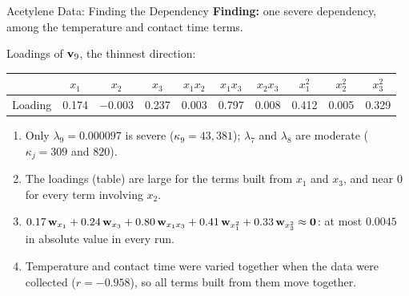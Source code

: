 \begin{frame}{Acetylene Data: Finding the Dependency}
    \small
    \textbf{Finding:} one severe dependency, among the temperature and contact time terms.
    \begin{center}
        \footnotesize
        Loadings of $\mathbf{v}_9$, the thinnest direction:\\[0.2em]
        \begin{tabular}{lccccccccc}
            \toprule
            & $x_1$ & $x_2$ & $x_3$ & $x_1x_2$ & $x_1x_3$ & $x_2x_3$ & $x_1^2$ & $x_2^2$ & $x_3^2$ \\
            \midrule
            Loading & 0.174 & $-0.003$ & 0.237 & 0.003 & 0.797 & 0.008 & 0.412 & 0.005 & 0.329 \\
            \bottomrule
        \end{tabular}
    \end{center}
    \footnotesize
    \begin{enumerate}
        \setlength{\itemsep}{0.2em}
        \item Only $\lambda_9=0.000097$ is severe ($\kappa_9=43{,}381$); $\lambda_7$ and $\lambda_8$ are moderate ($\kappa_j=309$ and $820$).
        \item The loadings (table) are large for the terms built from $x_1$ and $x_3$, and near 0 for every term involving $x_2$.
        \item $0.17\,\mathbf{w}_{x_1}+0.24\,\mathbf{w}_{x_3}+0.80\,\mathbf{w}_{x_1x_3}+0.41\,\mathbf{w}_{x_1^2}+0.33\,\mathbf{w}_{x_3^2}\approx\mathbf{0}$: at most $0.0045$ in absolute value in every run.
        \item Temperature and contact time were varied together when the data were collected ($r=-0.958$), so all terms built from them move together.
    \end{enumerate}
\end{frame}


